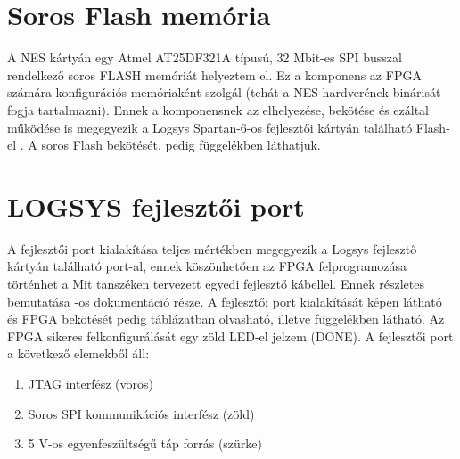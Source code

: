 \section{Soros Flash memória}
	
	A NES kártyán egy Atmel AT25DF321A típusú, 32 Mbit-es SPI busszal rendelkező soros FLASH memóriát helyeztem el. Ez a komponens az FPGA számára konfigurációs memóriaként szolgál (tehát a NES hardverének binárisát fogja tartalmazni). Ennek a komponensnek az elhelyezése, bekötése és ezáltal működése is megegyezik a Logsys Spartan-6-os fejlesztői kártyán található Flash-el \cite{spatan6}. A soros Flash bekötését, pedig  függelékben láthatjuk.
	
\section{LOGSYS fejlesztői port}
	
	A fejlesztői port kialakítása teljes mértékben megegyezik a Logsys fejlesztő kártyán található port-al, ennek köszönhetően az FPGA felprogramozása történhet a Mit tanszéken tervezett egyedi fejlesztő kábellel. Ennek részletes bemutatása -os dokumentáció része. A fejlesztői port kialakítását  képen látható és FPGA bekötését pedig  táblázatban olvasható, illetve  függelékben látható. Az FPGA sikeres felkonfigurálását egy zöld LED-el jelzem (DONE). A fejlesztői port a következő elemekből áll:  
	
	\begin{enumerate}
		\item JTAG interfész (vörös)
		\item Soros SPI kommunikációs interfész (zöld)
		\item 5 V-os egyenfeszültségű táp forrás (szürke)
	\end{enumerate}
	
